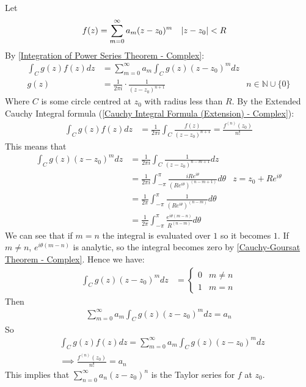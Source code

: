 \documentclass[12pt, english]{book}
\makeatletter
\renewenvironment{proof}[1][\proofname]{\par
	\pushQED{\qed}%
	\normalfont \topsep6\p@\@plus6\p@\relax
	\list{}{%
		\settowidth{\leftmargin}{\itshape\proofname:\hskip\labelsep}%
		\setlength{\labelwidth}{0pt}%
		\setlength{\itemindent}{-\leftmargin}%
		}%
	\item[\hskip\labelsep\itshape#1\@addpunct{:}]\ignorespaces
	}{\popQED\endlist\@endpefalse}
\makeatother
\begin{document}
	\begin{proof}
		Let 
		\begin{align*}
			f(z) &= \sum_{m=0}^{\infty} a_m (z-z_0)^m & \abs{z-z_0} &< R
		\end{align*}
		By \cref{Integration of Power Series Theorem - Complex}:
		\begin{align*}
			\int_{C} g(z) f(z) dz &= \sum_{m=0}^{\infty} a_m \int_{C} g(z) (z-z_0)^m dz \\
			 g(z) &= \frac{1}{2\pi i} \cdot \frac{1}{(z-z_0)^{n+1}} & n \in \mathbb{N} \cup \{0\}
		\end{align*}
		Where \(C\) is some circle centred at \(z_0\) with radius less than \(R\).
		By the Extended Cauchy Integral formula (\cref{Cauchy Integral Formula (Extension) - Complex}):
		\begin{align*}
			\int_{C} g(z) f(z) dz &= \frac{1}{2\pi i} \int_{C} \frac{f(z)}{(z-z_0)^{n+1}} = \frac{f^{(n)}(z_0)}{n!}
		\end{align*}
		This means that 
		\begin{align*}
			\int_{C} g(z) (z-z_0)^m dz 
			&= \frac{1}{2\pi i} \int_{C} \frac{1}{(z-z_0)^{n-m+1}} dz \\
			&= \frac{1}{2\pi i} \int_{-\pi}^{\pi} \frac{iRe^{i\theta}}{(Re^{i\theta})^{(n-m+1)}} d\theta 
				& z = z_0 + Re^{i\theta} \\
			&= \frac{1}{2\pi} \int_{-\pi}^{\pi} \frac{1}{(Re^{i\theta})^{(n-m)}} d\theta \\
			&= \frac{1}{2\pi} \int_{-\pi}^{\pi} \frac{e^{i\theta(m-n)}}{R^{(n-m)}} d\theta 
		\end{align*}
		We can see that if \(m=n\) the integral is evaluated over \(1\) so it becomes \(1\). If \(m\neq n\), \(e^{i\theta(m-n)}\) is analytic, so the integral becomes zero by \cref{Cauchy-Goursat Theorem - Complex}. Hence we have:
		\begin{align*}
			\int_{C} g(z) (z-z_0)^m dz 
			&= \begin{cases}
				0 & m\neq n\\
				1 & m=n
			\end{cases}
		\end{align*}
		Then 
		\begin{align*}
			\sum_{m=0}^{\infty} a_m \int_{C} g(z)(z-z_0)^m dz = a_n
		\end{align*}
		So 
		\begin{align*}
			&\int_{C} g(z) f(z) dz = \sum_{m=0}^{\infty} a_m \int_{C} g(z) (z-z_0)^m dz \\
			&\implies \frac{f^{(n)}(z_0)}{n!} = a_n
		\end{align*}
		This implies that \( \sum_{n=0}^{\infty} a_n (z-z_0)^n \) is the Taylor series for \(f\) at \(z_0\).
	\end{proof}
\end{document}
